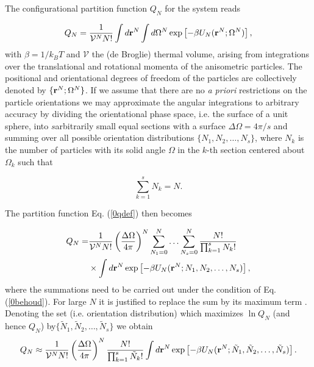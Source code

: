 {The configurational partition function $Q_{N}$ for the system reads

\begin{equation}
Q_{N}=\frac{1}{\mathcal{V} ^{N} N!}\int d{\bf r}^{N}\int d\Omega ^{N}\exp\left[-\beta U_{N}({\bf r}^{N}; \Omega^{N})\right],
\label{0qdef}
\end{equation}
with $\beta= 1/k_{B}T$ and $\mathcal{V}$ the (de Broglie) thermal volume, arising from integrations over the translational and rotational momenta of the anisometric particles. The positional and orientational degrees of freedom of the particles are collectively denoted by $\{{\bf r}^{N};\Omega^{N}\}$. If we assume that there are no  {\em a priori} restrictions on the particle orientations we may approximate the  angular integrations  to arbitrary accuracy by dividing the orientational phase space, i.e. the surface of a unit sphere, into $s$arbitrarily small equal sections  with a surface $\Delta \Omega = 4\pi/s$ and summing over all possible orientation distributions $\{N_{1},N_{2}, \ldots, N_{s}\}$, where $N_{k}$ is the number of particles with its solid angle $\Omega$ in the $k$-th section centered about
$\Omega_{k}$ such that

\begin{equation}
\sum _{k=1}^{s} N_{k} =N. \label{0behoud}
\end{equation}

The partition function Eq. (\ref{0qdef}) then becomes

\begin{align}
Q_{N}=&\frac{1}{\mathcal{V} ^{N} N!}\left(\frac{\Delta \Omega}{4\pi}\right)^{N}
\sum_{N_{1}=0}^{N}\ldots \sum_{N_{s}=0}^{N}\frac{N!}{\prod_{k=1}^{s}N_{k}!} \nonumber \\
&\times\int d{\bf r}^{N}
\exp\left[-\beta U_{N}({\bf r}^{N}; N_{1},N_{2},\ldots,N_{s})\right], \label{0Qalgemeen}
\end{align}
where the summations need to be carried out under the condition of Eq. (\ref{0behoud}). For large $N$ it is justified to replace the sum  by its maximum term \cite{Hill}. Denoting the set (i.e. orientation distribution) which maximizes $\ln Q_{N}$ (and hence $Q_{N}$) by$\{\tilde{N}_{1},\tilde{N}_{2},\ldots,\tilde{N}_{s}\}$ we obtain
\begin{equation}
Q_{N}\approx \frac{1}{\mathcal{V} ^{N} N!}\left(\frac{\Delta \Omega}{4\pi}\right)^{N}
\frac{N!}{\prod_{k=1}^{s}\tilde{N}_{k}!}\int d{\bf r}^{N}
\exp\left[-\beta U_{N}({\bf r}^{N}; \tilde{N}_{1},\tilde{N}_{2},\ldots,\tilde{N}_{s})\right].
\end{equation}

}
